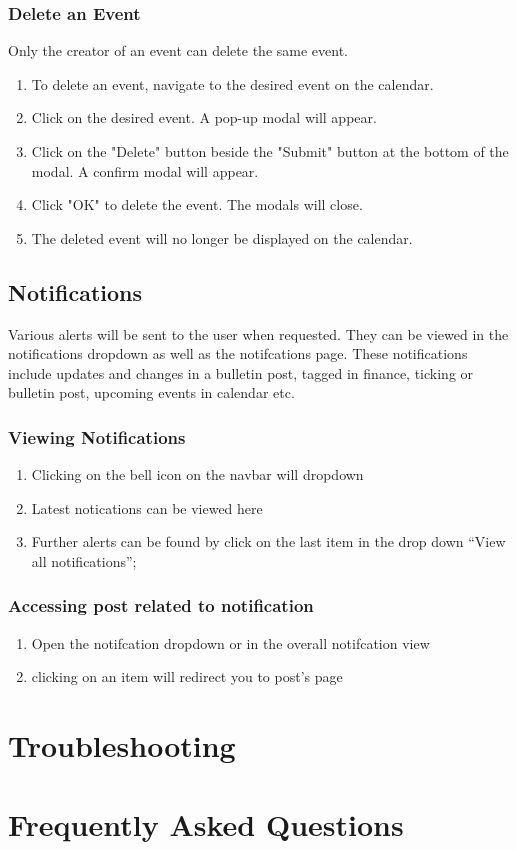 \documentclass[12pt]{article}
\begin{document}
\subsubsection{Delete an Event}
Only the creator of an event can delete the same event.
\begin{enumerate}
\item To delete an event, navigate to the desired event on the calendar.
\item Click on the desired event. A pop-up modal will appear.
\item Click on the "Delete" button beside the "Submit" button at the bottom of the modal.  A confirm modal will appear.
\item Click "OK" to delete the event. The modals will close.
\item The deleted event will no longer be displayed on the calendar.
\end{enumerate}

\subsection{Notifications}
Various alerts will be sent to the user when requested. They can be viewed in the notifications dropdown as well as the notifcations page.
These notifications include updates and changes in a bulletin post, tagged in finance, ticking or bulletin post, upcoming events in calendar etc.
\subsubsection{Viewing Notifications}
\begin{enumerate}
\item Clicking on the bell icon on the navbar will dropdown
\item Latest notications can be viewed here
\item Further alerts can be found by click on the last item in the drop down ``View all notifications'';
\end{enumerate}
\subsubsection{Accessing post related to notification}
\begin{enumerate}
\item Open the notifcation dropdown or in the overall notifcation view
\item clicking on an item will redirect you to post's page
\end{enumerate}



\section{Troubleshooting}

\section{Frequently Asked Questions}

\end{document}
